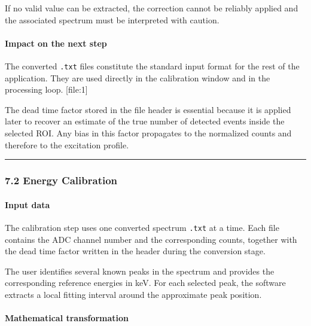 If no valid value can be extracted, the correction cannot be reliably
applied and the associated spectrum must be interpreted with caution.

\hypertarget{impact-on-the-next-step}{%
\paragraph{Impact on the next step}\label{impact-on-the-next-step}}

The converted \texttt{.txt} files constitute the standard input format
for the rest of the application. They are used directly in the
calibration window and in the processing loop. {[}file:1{]}

The dead time factor stored in the file header is essential because it
is applied later to recover an estimate of the true number of detected
events inside the selected ROI. Any bias in this factor propagates to
the normalized counts and therefore to the excitation profile.

\begin{center}\rule{0.5\linewidth}{0.5pt}\end{center}

\hypertarget{energy-calibration}{%
\subsubsection{7.2 Energy Calibration}\label{energy-calibration}}

\hypertarget{input-data-1}{%
\paragraph{Input data}\label{input-data-1}}

The calibration step uses one converted spectrum \texttt{.txt} at a
time. Each file contains the ADC channel number and the corresponding
counts, together with the dead time factor written in the header during
the conversion stage.

The user identifies several known peaks in the spectrum and provides the
corresponding reference energies in keV. For each selected peak, the
software extracts a local fitting interval around the approximate peak
position.

\hypertarget{mathematical-transformation-1}{%
\paragraph{Mathematical
transformation}\label{mathematical-transformation-1}}


